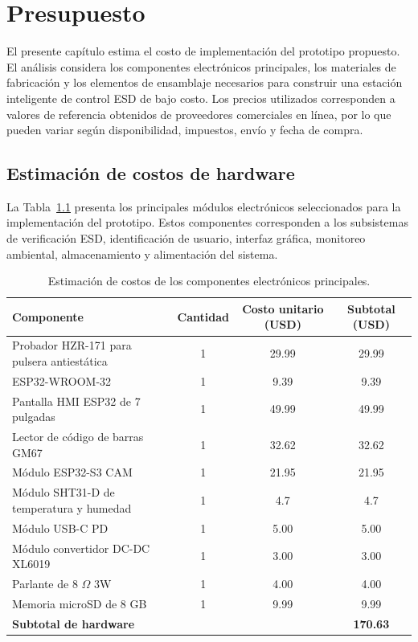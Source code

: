 \chapter{Presupuesto}

El presente capítulo estima el costo de implementación del prototipo propuesto. El análisis
considera los componentes electrónicos principales, los materiales de fabricación y los
elementos de ensamblaje necesarios para construir una estación inteligente de control ESD
de bajo costo. Los precios utilizados corresponden a valores de referencia obtenidos de
proveedores comerciales en línea, por lo que pueden variar según disponibilidad, impuestos,
envío y fecha de compra.

\section{Estimación de costos de hardware}

La Tabla~\ref{tab:presupuesto_hardware} presenta los principales módulos electrónicos
seleccionados para la implementación del prototipo. Estos componentes corresponden a los
subsistemas de verificación ESD, identificación de usuario, interfaz gráfica, monitoreo
ambiental, almacenamiento y alimentación del sistema.

\begin{table}[H]
\centering
\caption{Estimación de costos de los componentes electrónicos principales.}
\label{tab:presupuesto_hardware}
\begin{tabular}{p{5.2cm} c c c}
\toprule
\textbf{Componente} & \textbf{Cantidad} & \textbf{Costo unitario (USD)} & \textbf{Subtotal (USD)} \\
\midrule
Probador HZR-171 para pulsera antiestática~\cite{HZR171} & 1 & 29.99 & 29.99 \\
ESP32-WROOM-32~\cite{ESP32WROOM32Amazon} & 1 & 9.39 & 9.39 \\
Pantalla HMI ESP32 de 7 pulgadas~\cite{ElecrowESP32HMI7} & 1 & 49.99 & 49.99 \\
Lector de código de barras GM67~\cite{GM67Ebay} & 1 & 32.62 & 32.62 \\
Módulo ESP32-S3 CAM~\cite{FreenoveESP32S3CAM} & 1 & 21.95 & 21.95 \\
Módulo SHT31-D de temperatura y humedad~\cite{SHT31Module} & 1 & 4.7 & 4.7 \\
Módulo USB-C PD~\cite{AITRIPPDTrigger} & 1 & 5.00 & 5.00 \\
Módulo convertidor DC-DC XL6019~\cite{XL6019BoostModule} & 1 & 3.00 & 3.00 \\
Parlante de 8 $\Omega$ 3W \cite{Speaker8Ohm3W} & 1 & 4.00 & 4.00 \\
Memoria microSD de 8 GB \cite{MicroSD8GB} & 1 & 9.99 & 9.99 \\
\midrule
\textbf{Subtotal de hardware} &  &  & \textbf{170.63} \\
\bottomrule
\end{tabular}
\end{table}

